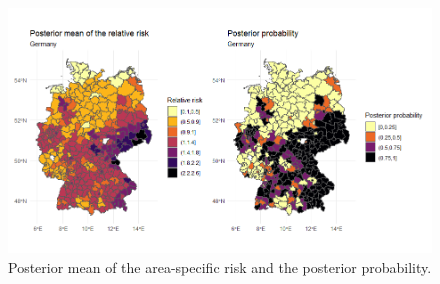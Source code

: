 \begin{figure}[H]
    \centering
    \includegraphics[width = \textwidth]{posterior_germany.png}
    \caption{Posterior mean of the area-specific risk and the posterior probability.}
    \label{posteriorGermany}
\end{figure}
%     
